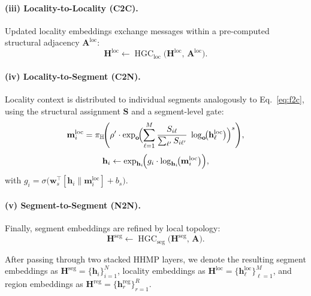 \paragraph{(iii) Locality-to-Locality (C2C).}
Updated locality embeddings exchange messages within a pre-computed structural adjacency $\mathbf{A}^{\text{loc}}$:
\begin{equation}\label{eq:c2c}
  \mathbf{H}^{\text{loc}} \leftarrow \operatorname{HGC}_{\text{loc}}\!\bigl(\mathbf{H}^{\text{loc}},\, \mathbf{A}^{\text{loc}}\bigr).
\end{equation}

\paragraph{(iv) Locality-to-Segment (C2N).}
Locality context is distributed to individual segments analogously to Eq.~\eqref{eq:f2c}, using the structural assignment $\mathbf{S}$ and a segment-level gate:
\begin{equation}\label{eq:c2n_msg}
  \mathbf{m}_i^{\text{loc}}
  = \pi_{\mathbb{H}}\!\Biggl(
      \rho' \cdot \exp_{\mathbf{o}}\!\Bigl(
        \sum_{\ell=1}^{M} \frac{S_{i\ell}}{\sum_{\ell'} S_{i\ell'}}\;
        \log_{\mathbf{o}}\!\bigl(\mathbf{h}_\ell^{\text{loc}}\bigr)
      \Bigr)^s
    \Biggr),
\end{equation}
\begin{equation}\label{eq:gate_seg}
  \mathbf{h}_i
  \leftarrow \exp_{\mathbf{h}_i}\!\Bigl(
    g_i \cdot \log_{\mathbf{h}_i}\!\bigl(\mathbf{m}_i^{\text{loc}}\bigr)
  \Bigr),
\end{equation}
with $g_i = \sigma\!\bigl(\mathbf{w}_s^\top [\mathbf{h}_i \| \mathbf{m}_i^{\text{loc}}] + b_s\bigr)$.

\paragraph{(v) Segment-to-Segment (N2N).}
Finally, segment embeddings are refined by local topology:
\begin{equation}\label{eq:n2n}
  \mathbf{H}^{\text{seg}} \leftarrow \operatorname{HGC}_{\text{seg}}\!\bigl(\mathbf{H}^{\text{seg}},\, \mathbf{A}\bigr).
\end{equation}

After passing through two stacked HHMP layers, we denote the resulting segment embeddings as
$\mathbf{H}^{\text{seg}} = \{\mathbf{h}_i\}_{i=1}^{N}$,
locality embeddings as $\mathbf{H}^{\text{loc}} = \{\mathbf{h}_\ell^{\text{loc}}\}_{\ell=1}^{M}$,
and region embeddings as $\mathbf{H}^{\text{reg}} = \{\mathbf{h}_r^{\text{reg}}\}_{r=1}^{R}$.

